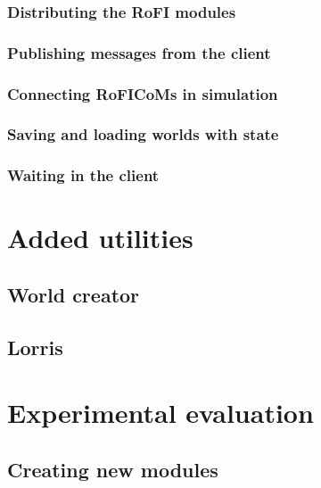 \documentclass[
  digital, %
  table,   %
  oneside, %
  nolof,     %
  nolot,     %
]{fithesis3}
\begin{document}
\subsection{Distributing the RoFI modules}

\subsection{Publishing messages from the client}

\subsection{Connecting RoFICoMs in simulation}

\subsection{Saving and loading worlds with state}

\subsection{Waiting in the client}


\chapter{Added utilities}

\section{World creator}

\section{Lorris}


\chapter{Experimental evaluation}

\section{Creating new modules}
\label{ex-modules}

\end{document}
